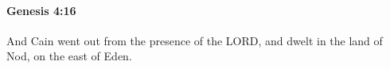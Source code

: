
		\paragraph{Genesis 4:16} %
			\label{GENESIS-4-16}

			And Cain went out from the presence of the LORD, and dwelt in the land of Nod, on the east of Eden.


